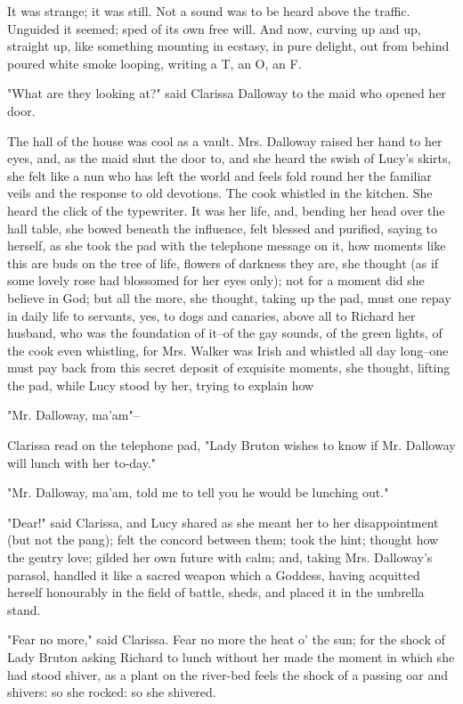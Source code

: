 \documentclass[lang=cn,10pt]{elegantbook}
\begin{document}
It was strange; it was still.  Not a sound was to be heard above
the traffic.  Unguided it seemed; sped of its own free will.  And
now, curving up and up, straight up, like something mounting in
ecstasy, in pure delight, out from behind poured white smoke
looping, writing a T, an O, an F.



"What are they looking at?" said Clarissa Dalloway to the maid who
opened her door.

The hall of the house was cool as a vault.  Mrs. Dalloway raised
her hand to her eyes, and, as the maid shut the door to, and she
heard the swish of Lucy's skirts, she felt like a nun who has left
the world and feels fold round her the familiar veils and the
response to old devotions.  The cook whistled in the kitchen.  She
heard the click of the typewriter.  It was her life, and, bending
her head over the hall table, she bowed beneath the influence, felt
blessed and purified, saying to herself, as she took the pad with
the telephone message on it, how moments like this are buds on the
tree of life, flowers of darkness they are, she thought (as if some
lovely rose had blossomed for her eyes only); not for a moment did
she believe in God; but all the more, she thought, taking up the
pad, must one repay in daily life to servants, yes, to dogs and
canaries, above all to Richard her husband, who was the foundation
of it--of the gay sounds, of the green lights, of the cook even
whistling, for Mrs. Walker was Irish and whistled all day long--one
must pay back from this secret deposit of exquisite moments, she
thought, lifting the pad, while Lucy stood by her, trying to
explain how

"Mr. Dalloway, ma'am"--

Clarissa read on the telephone pad, "Lady Bruton wishes to know if
Mr. Dalloway will lunch with her to-day."

"Mr. Dalloway, ma'am, told me to tell you he would be lunching
out."

"Dear!" said Clarissa, and Lucy shared as she meant her to her
disappointment (but not the pang); felt the concord between them;
took the hint; thought how the gentry love; gilded her own future
with calm; and, taking Mrs. Dalloway's parasol, handled it like a
sacred weapon which a Goddess, having acquitted herself honourably
in the field of battle, sheds, and placed it in the umbrella stand.

"Fear no more," said Clarissa.  Fear no more the heat o' the sun;
for the shock of Lady Bruton asking Richard to lunch without her
made the moment in which she had stood shiver, as a plant on the
river-bed feels the shock of a passing oar and shivers: so she
rocked: so she shivered.
\end{document}
